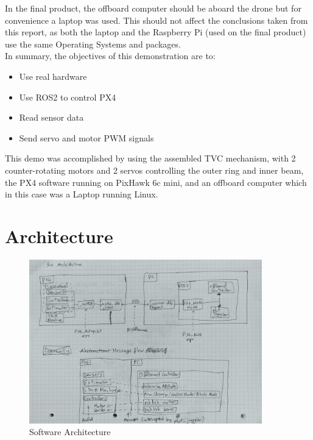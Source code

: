 \documentclass[a4paper]{article}
\begin{document}
In the final product, the offboard computer should be aboard the drone but for convenience a laptop was used. 
This should not affect the conclusions taken from this report, as both the laptop and the Raspberry Pi (used on the final product) use the same Operating Systems and packages. \\ 

In summary, the objectives of this demonstration are to: 

\begin{itemize}
    \item Use real hardware 
    \item Use ROS2 to control PX4
    \item Read sensor data 
    \item Send servo and motor PWM signals 
\end{itemize}

This demo was accomplished by using the assembled TVC mechanism, with 2 counter-rotating motors and 2 servos controlling the outer ring and inner beam, the PX4 software running on PixHawk 6c mini, and an offboard computer which in this case was a Laptop running Linux. 



\clearpage
\section{Architecture}

\begin{figure}[H]
    \centering
    \includegraphics[width=0.9\textwidth]{imgs/Software Diagram.jpg}
    \caption{Software Architecture}
    \label{fig:software_architecture}
\end{figure}
\end{document}
